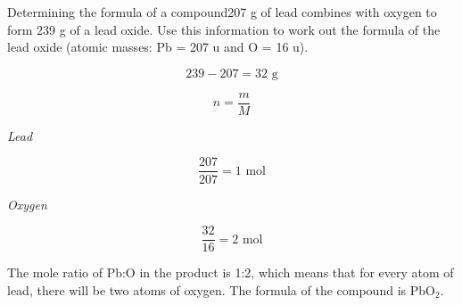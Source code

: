 \begin{wex}{Determining the formula of a compound}{207 g of lead combines with oxygen to form 239 g of a lead oxide. Use this information to work out the formula of the lead oxide (atomic masses: Pb = 207 u and O = 16 u).}

{

\begin{equation*}
239 - 207 = 32 \text{ g}
\end{equation*}
}

{

\begin{equation*}
n = \frac{m}{M}
\end{equation*}

\textit{Lead}

\begin{equation*}
\frac{207}{207} = 1 \text{ mol}
\end{equation*}

\textit{Oxygen}

\begin{equation*}
\frac{32}{16} = 2 \text{ mol}
\end{equation*}
}

{

The mole ratio of Pb:O in the product is 1:2, which means that for every atom of lead, there will be two atoms of oxygen. The formula of the compound is PbO$_{2}$.
}
\end{wex}

